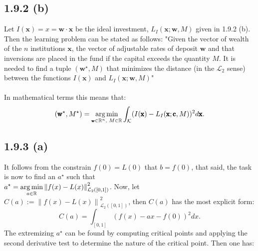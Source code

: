 \documentclass{exam}
\DeclareMathOperator*{\argmin}{arg\,min}
\begin{document}
\subsection*{1.9.2 (b)}
Let $I(\pmb{\text{x}}) = x = \pmb{\text{w}} \cdot \pmb{\text{x}}$ be the ideal investment, $L_{I}(\pmb{\text{x}};\pmb{\text{w}},M)$ given in 1.9.2 (b). Then the learning problem 
can be stated as follows: "Given the vector of wealth of the $n$ institutions $\pmb{\text{x}}$, the vector of adjustable rates of deposit $\pmb{\text{w}}$ and that inversions are placed 
in the fund if the capital exceeds the quantity $M$. It is needed to find a tuple $(\pmb{\text{w}}^\star,M)$ that minimizes the distance (in the $\mathcal{L}_2$ sense) between the functions
$I(\pmb{\text{x}})$ and $L_{I}(\pmb{\text{x}};\pmb{\text{w}},M)$" \\
\\
In mathematical terms this means that: \begin{equation*} 
    (\pmb{\text{w}}^\star,M^\star) = \argmin_{\tiny\pmb{\text{w}} \in \mathbb{R}^n \text{, } M \in \mathbb{R}} \displaystyle \int_{\mathcal{K}} (I(\pmb{\text{x}}) - L_{I}(\pmb{\text{x}};\pmb{\text{c}},M))^2 d \pmb{\text{x}}.
\end{equation*} 

\subsection*{1.9.3 (a)}
It follows from the constrain $f(0) = L(0)$ that $b = f(0)$, that said, the task is now to find an $a^\star$ such that\\
$\displaystyle a^\star = \argmin_{ \tiny a \in \mathbb{R}} {\lVert f(x) - L(x) \rVert}^2_{\mathcal{L}_2([0,1])}$. Now, let $C(a) := {\lVert f(x) - L(x) \rVert}^2_{\mathcal{L}_2([0,1])}$, then $C(a)$ has the most explicit form: 
\begin{equation*}
    C(a) = \displaystyle \int_{[0,1]} (f(x) - ax -f(0))^2 d x.
\end{equation*}
The extremizing $a^\star$ can be found by computing critical points and applying the second derivative test to determine the nature of the critical point. Then one has: \\
\end{document}
